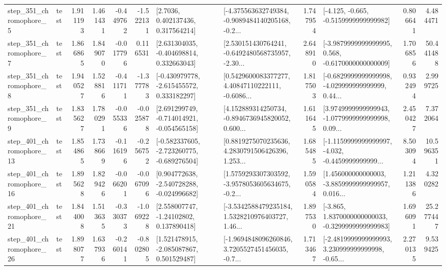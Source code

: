 \begin{tabular}{llrrrrllrlrr}
   step\_351\_chromophore\_5 &      test &      1.911193 &    1.461431 &     -0.449762 & -1.522131 &          [2.7036, 0.402137436, 0.317564214] &  [-4.375563632749384, -0.9089484140205168, -0.2... &       1.747954 &              [-4.125, -0.665, -0.5159999999999982] &            0.806641 &          4.484471 \\
   step\_351\_chromophore\_7 &      test &      1.866865 &    1.849070 &     -0.017796 &  0.116531 &    [2.631304035, -0.404698814, 0.332663043] &  [2.530151430764241, -0.6492480568735957, -2.30... &       2.648910 &  [-3.9879999999999995, 0.568, -0.6170000000000009] &            1.706856 &         50.441488 \\
   step\_351\_chromophore\_8 &      test &      1.940527 &    1.528816 &     -0.411711 & -1.377783 &   [-0.430979778, -2.615455572, 0.333182297] &  [0.5429600083377277, 4.40847110222111, -0.6086... &       1.817503 &  [-0.6829999999999998, -4.029999999999999, 0.44... &            0.932494 &          2.999725 \\
   step\_351\_chromophore\_9 &      test &      1.835627 &    1.780291 &     -0.055336 & -0.025878 &   [2.691299749, -0.714014921, -0.054565158] &  [4.152889314250734, -0.8946736945820052, 0.600... &       1.611645 &  [3.9749999999999943, -1.0779999999999998, 0.09... &            2.450427 &          7.372064 \\
  step\_401\_chromophore\_13 &      test &      1.854865 &    1.738669 &     -0.116196 & -0.256752 &  [-0.582337605, -2.723260775, -0.689276504] &  [0.8819275070235636, 4.2830791506426396, 1.253... &       1.685485 &  [-1.1159999999999997, -4.032, -0.4459999999999... &            8.503094 &         10.596351 \\
  step\_401\_chromophore\_16 &      test &      1.895628 &    1.829426 &     -0.066201 & -0.067096 &   [0.904772638, -2.540728288, -0.024996682] &  [1.5759293307303592, -3.9578053605634675, -0.2... &       1.590584 &  [1.456000000000003, -3.8859999999999957, 0.016... &            1.211386 &          4.320282 \\
  step\_401\_chromophore\_21 &      test &      1.844008 &    1.513635 &     -0.330373 & -1.069228 &     [2.558007747, -1.24102802, 0.137890418] &  [-3.5342588479235184, 1.5328210976403727, 1.46... &       1.897530 &  [-3.865, 1.8370000000000033, -0.3299999999999983] &            1.696091 &         25.277447 \\
  step\_401\_chromophore\_26 &      test &      1.898077 &    1.637936 &     -0.260141 & -0.802805 &    [1.521478915, -2.085087867, 0.501529487] &  [-1.9694848096260846, 3.7205527451456035, -0.7... &       1.713467 &  [-2.4819999999999993, 3.230999999999998, -0.65... &            2.270135 &          9.539425 \\

\end{tabular}
